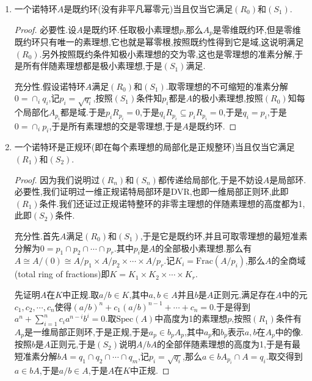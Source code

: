 \begin{enumerate}
\begin{proof}
		设$A$满足$(R_n)$,任取素理想$p$,需要验证$A_p$满足$(R_n)$.任取$A_p$的素理想$qA_p$满足$\mathrm{ht}(qA_p)\le n$,那么$\mathrm{ht}(q)\le n$.于是$A_q=(A_p)_{qA_p}$是正则环.
		
		设$A$满足$(S_n)$,任取素理想$p$,需要验证$A_p$满足$(S_n)$.任取$A_p$的素理想$qA_p$使得$\mathrm{depth}((A_p)_{qA_p})=\mathrm{depth}(A_q)\le n$,于是$A_q$是CM环.
	\end{proof}
    \item 一个诺特环$A$是既约环(没有非平凡幂零元)当且仅当它满足$(R_0)$和$(S_1)$.
    \begin{proof}
    	
    	必要性.设$A$是既约环.任取极小素理想$p$,那么$A_p$是零维既约环,但是零维既约环只有唯一的素理想,它也就是幂零根,按照既约性得到它是域,这说明满足$(R_0)$.另外按照既约条件知极小素理想的交为零,这也是零理想的准素分解,于是所有伴随素理想都是极小素理想,于是$(S_1)$满足.
    	
    	充分性.假设诺特环$A$满足$(R_0)$和$(S_1)$.取零理想的不可缩短的准素分解$0=\cap_iq_i$,记$p_i=\sqrt{q_i}$,按照$(S_1)$条件知$p_i$都是$A$的极小素理想,按照$(R_0)$知每个局部化$A_{p_i}$都是域.于是$p_iR_{p_i}=0$,于是$q_iR_{p_i}\subseteq p_iR_{p_i}=0$,于是$q_i=p_i$,于是$0=\cap_ip_i$,于是所有素理想的交是零理想,于是$A$是既约环.
    \end{proof}
    \item 一个诺特环是正规环(即在每个素理想的局部化是正规整环)当且仅当它满足$(R_1)$和$(S_2)$.
    \begin{proof}
    	
    	因为我们说明过$(R_n)$和$(S_n)$都传递给局部化,于是不妨设$A$是局部环.必要性,我们证明过一维正规诺特局部环是DVR,也即一维局部正则环,此即$(R_1)$条件.我们还证过正规诺特整环的非零主理想的伴随素理想的高度都为1,此即$(S_2)$条件.
    	
    	充分性.首先$A$满足$(R_0)$和$(S_1)$,于是它是既约环,并且可取零理想的最短准素分解为$0=p_1\cap p_2\cap\cdots\cap p_r$.其中$p_i$是$A$的全部极小素理想.那么有$A\cong A/(0)\cong A/p_1\times A/p_2\times\cdots\times A/p_r$.记$K_i=\mathrm{Frac}(A/p_i)$,那么$A$的全商域(total ring of fractions)即$K=K_1\times K_2\times\cdots\times K_r$.
    	
    	先证明$A$在$K$中正规.取$a/b\in K$,其中$a,b\in A$并且$b$是$A$正则元,满足存在$A$中的元$c_1,c_2,\cdots,c_n$使得$(a/b)^n+c_1(a/b)^{n-1}+\cdots+c_n=0$.于是得到$a^n+\sum_{i=1}^nc_ia^{n-i}b^i=0$.取$\mathrm{Spec}(A)$中高度为1的素理想$p$,按照$(R_1)$条件有$A_p$是一维局部正则环,于是正规,于是$a_p\in b_pA_p$,其中$a_p$和$b_p$表示$a,b$在$A_p$中的像.按照$b$是$A$正则元,于是$(S_2)$说明$A/bA$的全部伴随素理想的高度为1,于是有最短准素分解$bA=q_1\cap q_2\cap\cdots\cap q_m$,记$p_i=\sqrt{q_i}$,那么$a\in bA_{p_i}\cap A=q_i$.取交得到$a\in bA$,于是$a/b\in A$,于是$A$在$K$中正规.
    	

\end{proof}
\end{enumerate}
